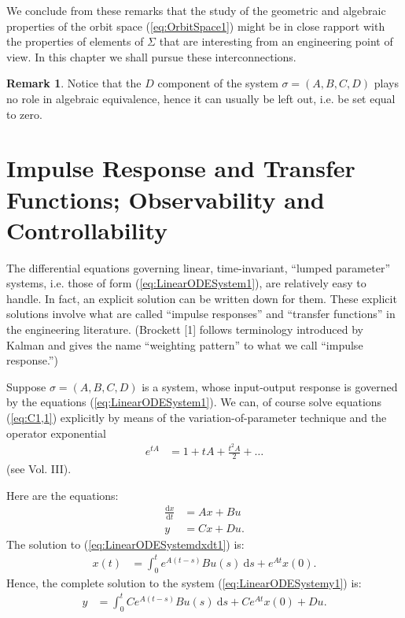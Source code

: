 \documentclass[12pt]{book}
\theoremstyle{plain}
\theoremstyle{definition}
\newtheorem*{remark}{Remark}
\newcommand{\dd}[1]{\mathrm{d}#1}
\begin{document}
We conclude from these remarks that the study of the geometric and algebraic properties of the orbit space (\ref{eq:OrbitSpace1}) might be in close rapport with the properties of elements of $\Sigma$ that are interesting from an engineering point of view.
In this chapter we shall pursue these interconnections.

\begin{remark}
    Notice that the $D$ component of the system $\sigma = (A, B, C, D)$ plays no role in algebraic equivalence, hence it can usually be left out, i.e. be set equal to zero.
\end{remark}

\section{Impulse Response and Transfer Functions; Observability and Controllability}

The differential equations governing linear, time-invariant, ``lumped parameter'' systems, i.e. those of form (\ref{eq:LinearODESystem1}), are relatively easy to handle.
In fact, an explicit solution can be written down for them.
These explicit solutions involve what are called ``impulse responses'' and ``transfer functions'' in the engineering literature.
(Brockett [1] follows terminology introduced by Kalman and gives the name ``weighting pattern'' to what we call ``impulse response.'') %

Suppose $\sigma = (A, B, C, D)$ is a system, whose input-output response is governed by the equations (\ref{eq:LinearODESystem1}).
We can, of course solve equations (\ref{eq:C1,1}) explicitly by means of the variation-of-parameter technique and the operator exponential
\begin{align}
    e^{tA} &= 1 + tA + \frac{t^2A}{2} + \dots
\end{align}
(see Vol. III).

Here are the equations:
\begin{align}
    \frac{\dd{x}}{\dd{t}} &= Ax + Bu \label{eq:LinearODESystemdxdt1} \\
    y &= Cx + Du. \label{eq:LinearODESystemy1}
\end{align}
The solution to (\ref{eq:LinearODESystemdxdt1}) is:
\begin{align}
    x(t) &= \int_0^t e^{A(t-s)}Bu(s)\ \dd{s} + e^{At}x(0).
\end{align}
Hence, the complete solution to the system (\ref{eq:LinearODESystemy1}) is:
\begin{align} \label{eq:LinearODESystemy1Solution1}
    y &= \int_0^t Ce^{A(t-s)}Bu(s)\ \dd{s} + Ce^{At}x(0) + Du.
\end{align}
\end{document}

